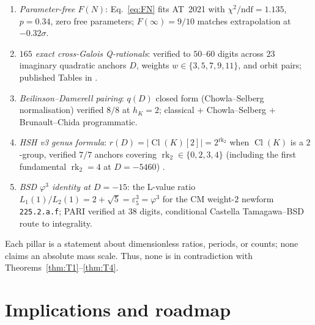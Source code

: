\documentclass[aps,prl,reprint,superscriptaddress,floatfix,nofootinbib,amssymb]{revtex4-2}
\theoremstyle{definition}
\theoremstyle{remark}
\DeclareMathOperator{\Cl}{Cl}
\DeclareMathOperator{\rk}{rk}
\begin{document}
\begin{enumerate}
\item[\textbf{P1}.] \emph{Parameter-free $F(N)$}: Eq.~\eqref{eq:FN}
fits AT~2021 with $\chi^2/\mathrm{ndf}=1.135$, $p=0.34$, zero free
parameters; $F(\infty)=9/10$ matches \cite[Tab.~38]{AthenodorouTeper2021}
extrapolation at $-0.32\sigma$.
\item[\textbf{P2}.] \emph{$165$ exact cross-Galois Q-rationals}:
verified to $50$--$60$ digits across $23$ imaginary quadratic anchors
$D$, weights $w\in\{3,5,7,9,11\}$, and orbit pairs; published Tables
in \cite{ECI_v15_2026}.
\item[\textbf{P3}.] \emph{Beilinson--Damerell pairing}: $q(D)$
closed form (Chowla--Selberg normalisation) verified $8/8$ at $h_K=2$;
classical \cite{Damerell1971} + Chowla--Selberg \cite{ChowlaSelberg1949}
+ Brunault--Chida \cite{BrunaultChida2015} programmatic.
\item[\textbf{P4}.] \emph{HSH v3 genus formula}:
$r(D) = |\Cl(K)[2]| = 2^{\rk_2}$ when $\Cl(K)$ is a $2$-group,
verified $7/7$ anchors covering $\rk_2 \in \{0,2,3,4\}$
(including the first fundamental $\rk_2 = 4$ at $D = -5460$)
\cite{RemondiereHSH2026}.
\item[\textbf{P5}.] \emph{BSD $\varphi^3$ identity at $D=-15$}:
the L-value ratio $L_1(1)/L_2(1) = 2+\sqrt 5 = \varepsilon_5^3 =
\varphi^3$ for the CM weight-$2$ newform \texttt{225.2.a.f}; PARI
verified at $38$ digits, conditional Castella \cite{Castella2025}
Tamagawa--BSD route to integrality.
\end{enumerate}

Each pillar is a statement about dimensionless ratios, periods, or
counts; none claims an absolute mass scale. Thus, none is in
contradiction with Theorems~\ref{thm:T1}--\ref{thm:T4}.

\section{Implications and roadmap}\label{sec:implications}
\end{document}
